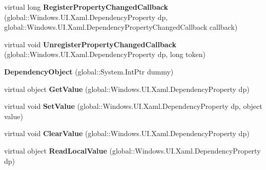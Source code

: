 \begin{DoxyCompactItemize}
\item 
\mbox{\label{class_windows_1_1_u_i_1_1_xaml_1_1_dependency_object_ab58e52b043959b48f59e0631b15126f7}} 
virtual long {\bfseries Register\+Property\+Changed\+Callback} (global\+::\+Windows.\+U\+I.\+Xaml.\+Dependency\+Property dp, global\+::\+Windows.\+U\+I.\+Xaml.\+Dependency\+Property\+Changed\+Callback callback)
\item 
\mbox{\label{class_windows_1_1_u_i_1_1_xaml_1_1_dependency_object_a1038375289633f64b7f560eb26de036f}} 
virtual void {\bfseries Unregister\+Property\+Changed\+Callback} (global\+::\+Windows.\+U\+I.\+Xaml.\+Dependency\+Property dp, long token)
\item 
\mbox{\label{class_windows_1_1_u_i_1_1_xaml_1_1_dependency_object_a50ca400c3d5d8fb25c7f568083aab1b9}} 
{\bfseries Dependency\+Object} (global\+::\+System.\+Int\+Ptr dummy)
\item 
\mbox{\label{class_windows_1_1_u_i_1_1_xaml_1_1_dependency_object_ab7542d3826e3529750a867a66f41f33f}} 
virtual object {\bfseries Get\+Value} (global\+::\+Windows.\+U\+I.\+Xaml.\+Dependency\+Property dp)
\item 
\mbox{\label{class_windows_1_1_u_i_1_1_xaml_1_1_dependency_object_afbd5da79518b87e7eda7210ee248e8e2}} 
virtual void {\bfseries Set\+Value} (global\+::\+Windows.\+U\+I.\+Xaml.\+Dependency\+Property dp, object value)
\item 
\mbox{\label{class_windows_1_1_u_i_1_1_xaml_1_1_dependency_object_aae39f9b4dad56dfde575dd48bed82cd3}} 
virtual void {\bfseries Clear\+Value} (global\+::\+Windows.\+U\+I.\+Xaml.\+Dependency\+Property dp)
\item 
\mbox{\label{class_windows_1_1_u_i_1_1_xaml_1_1_dependency_object_adc36478eb501a1771f6d147333560730}} 
virtual object {\bfseries Read\+Local\+Value} (global\+::\+Windows.\+U\+I.\+Xaml.\+Dependency\+Property dp)
\item 

\end{DoxyCompactItemize}
